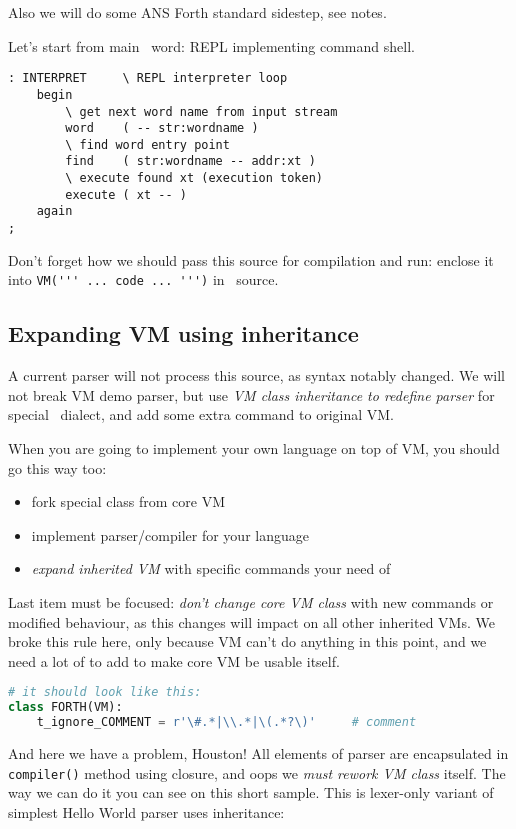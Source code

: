 \bigskip
Also we will do some ANS Forth standard sidestep, see notes.

\noindent
Let's start from main \F\ word: REPL implementing
command shell.
\begin{lstlisting}[language=Forth]
: INTERPRET		\ REPL interpreter loop
	begin
		\ get next word name from input stream
		word	( -- str:wordname ) 
		\ find word entry point
		find	( str:wordname -- addr:xt )
		\ execute found xt (execution token) 
		execute	( xt -- ) 
	again
;
\end{lstlisting}
Don't forget how we should pass this source for compilation and run:
enclose it into \verb|VM(''' ... code ... ''')| in \py\ source.

\subsection{Expanding VM using inheritance}

A current parser will not process this source, as syntax notably changed.
We will not break VM demo parser, but use \emph{VM class inheritance to redefine
parser} for special \F\ dialect, and add some extra command to original VM.

When you are going to implement your own language on top of VM, you should 
go this way too:
\begin{itemize}
\item fork special class from core VM
\item implement parser/compiler for your language
\item \emph{expand inherited VM} with specific commands your need of
\end{itemize}
Last item must be focused: \emph{don't change core VM class} with new commands
or modified behaviour, as this changes will impact on all other inherited VMs.
We broke this rule here, only because VM can't do anything in this point, and we
need a lot of to add to make core VM be usable itself.

\begin{lstlisting}[language=Python]
# it should look like this:
class FORTH(VM):
	t_ignore_COMMENT = r'\#.*|\\.*|\(.*?\)'		# comment
\end{lstlisting}

And here we have a problem, Houston! All elements of parser are encapsulated
in \verb|compiler()| method using closure, and oops
we \emph{must rework VM class} itself.
The way we can do it you can see on this short sample. This is
lexer-only variant of simplest Hello World parser uses inheritance:



